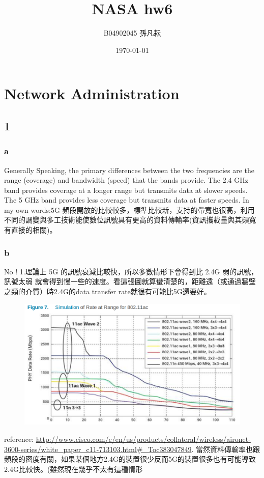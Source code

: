 \documentclass{article}
\title{NASA hw6}
\author{B04902045 孫凡耘}
\date{\today}
\begin{document}
\maketitle
    \section{Network Administration}
    \subsection{1}
    \subsubsection{a}
    Generally Speaking, the primary differences between the two frequencies are the range (coverage) and bandwidth (speed) that the bands provide. The 2.4 GHz band provides coverage at a longer range but transmits data at slower speeds. The 5 GHz band provides less coverage but transmits data at faster speeds.\newline
    In my own words:5G 頻段開放的比較較多，標準比較新，支持的帶寬也很高，利用不同的調變與多工技術能使數位訊號具有更高的資料傳輸率(資訊攜載量與其頻寬有直接的相關)。
    \subsubsection{b}
    No ! \newline
    1.理論上 5G 的訊號衰減比較快，所以多數情形下會得到比 2.4G 弱的訊號，訊號太弱 就會得到慢一些的速度。看這張圖就算蠻清楚的，距離遠（或通過牆壁之類的介質）時2.4G的data transfer rate就很有可能比5G還要好。
     \begin{figure}[!htb]
            \begin{flushleft}
            \includegraphics[scale=0.25]{pic.png}
            \end{flushleft}
    \end{figure}
    reference: \url{http://www.cisco.com/c/en/us/products/collateral/wireless/aironet-3600-series/white_paper_c11-713103.html#_Toc383047849}. 當然資料傳輸率也跟頻段的密度有關，如果某個地方2.4G的裝置很少反而5G的裝置很多也有可能導致2.4G比較快。(雖然現在幾乎不太有這種情形
\end{document}
